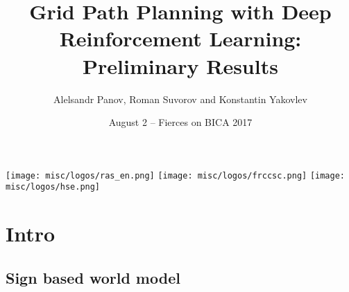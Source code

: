 \documentclass[default]{beamer}
\begin{document}
	
	\title[PathPlan+RL]{Grid Path Planning with Deep Reinforcement Learning: Preliminary Results}
	\author[Panov, Suvorov, Yakovlev]{Alelsandr Panov, Roman Suvorov and Konstantin Yakovlev}
	\date[August 2 -- FIERCES 2017]{August 2 -- Fierces on BICA 2017} 
		
	\begin{frame}
		\titlepage
		\centering
		\texttt{[image: misc/logos/ras\_en.png]} \hspace{10pt}
		\texttt{[image: misc/logos/frccsc.png]} \hspace{10pt}
		\texttt{[image: misc/logos/hse.png]}
	\end{frame}

	\section{Intro}
	\subsection{Sign based world model}
\end{document}
